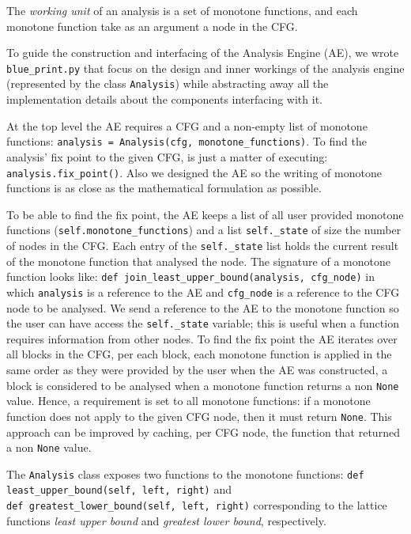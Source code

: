 The \emph{working unit} of an analysis is a set of monotone functions, and each monotone function take as an argument a node in the CFG. 

To guide the construction and interfacing of the Analysis Engine (AE), we wrote \texttt{blue\_print.py} that focus on the design and inner workings of the analysis engine (represented by the class \texttt{Analysis}) while abstracting away all the implementation details about the components interfacing with it. 

\newpar At the top level the AE requires a CFG and a non-empty list of monotone functions: \texttt{analysis = Analysis(cfg, monotone\_functions)}. To find the analysis' fix point to the given CFG, is just a matter of executing: \texttt{analysis.fix\_point()}. Also we designed the AE so the writing of monotone functions is as close as the mathematical formulation as possible.

\newpar To be able to find the fix point, the AE keeps a list of all user provided monotone functions (\texttt{self.monotone\_functions}) and a list \texttt{self.\_state} of size the number of nodes in the CFG. Each entry of the \texttt{self.\_state} list holds the current result of the monotone function that analysed the node. The signature of a monotone function looks like: \texttt{def join\_least\_upper\_bound(analysis, cfg\_node)} in which \texttt{analysis} is a reference to the AE and \texttt{cfg\_node} is a reference to the CFG node to be analysed. We send a reference to the AE to the monotone function so the user can have access the
\texttt{self.\_state} variable; this is useful when a function requires information from other nodes.
To find the fix point the AE iterates over all blocks in the CFG, per each block, each monotone function is applied in the same order as they were provided by the user when the AE was constructed, a block is considered to be analysed when a monotone function returns a non \texttt{None} value. Hence, a requirement is set to all monotone functions: if a monotone function does not apply to the given CFG node, then it must return \texttt{None}. This approach can be improved by caching, per CFG node, the function that returned a non \texttt{None} value.

\newpar The \texttt{Analysis} class exposes two functions to the monotone functions: \texttt{def least\_upper\_bound(self, left, right)} and \\\texttt{def greatest\_lower\_bound(self, left, right)} corresponding to the lattice functions \emph{least upper bound} and \emph{greatest lower bound}, respectively.


